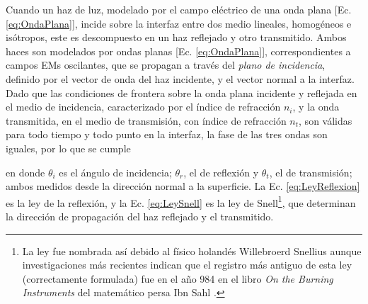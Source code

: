 Cuando un haz de luz, modelado por el campo eléctrico de una onda plana [Ec. \eqref{eq:OndaPlana}], incide sobre la interfaz entre dos medio lineales, homogéneos e isótropos, este es descompuesto en un haz reflejado y otro transmitido. Ambos haces son modelados por ondas planas [Ec. \eqref{eq:OndaPlana}], correspondientes a campos EMs oscilantes, que se propagan a través del \emph{plano de incidencia}, definido por el vector de onda del haz incidente, y el vector normal a la interfaz. Dado que las condiciones de frontera sobre la onda plana incidente y reflejada en el medio de incidencia, caracterizado por el índice de refracción $n_i$, y la onda transmitida, en el medio de transmisión, con índice de refracción $n_t$, son válidas para todo tiempo y todo punto en la interfaz, la fase de las tres ondas son iguales, por lo que se cumple \vspace*{-.5em}
%
	\begin{tcolorbox}[title = Ley de la reflexión y ley de Snell ]
	\end{tcolorbox}	 \vspace*{-.5em}\noindent
%
en donde $\theta_i$ es el ángulo de incidencia; $\theta_r$, el de reflexión y $\theta_t$, el de transmisión; ambos medidos desde la dirección normal a la superficie. La Ec. \eqref{eq:LeyReflexion} es la ley de la reflexión, y la Ec. \eqref{eq:LeySnell} es la ley de Snell\footnote{La ley fue nombrada así debido al físico holandés Willebroerd Snellius aunque investigaciones más recientes indican que el registro más antiguo de esta ley (correctamente formulada) fue en el año 984 en el libro \emph{On the Burning Instruments} del matemático persa Ibn Sahl \cite{kwan2002really}.}, que determinan la dirección de propagación del haz reflejado y el transmitido.

